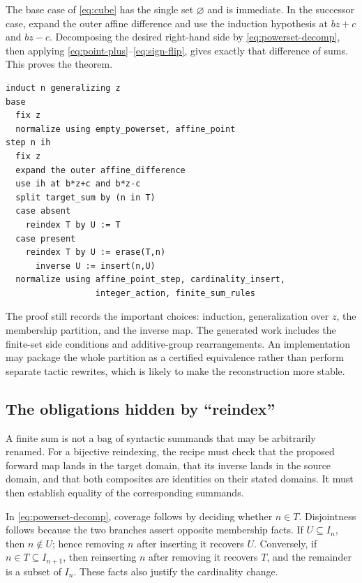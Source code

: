 \documentclass[11pt,letterpaper]{article}
\theoremstyle{remark}
\begin{document}
The base case of \eqref{eq:cube} has the single set $\varnothing$ and is immediate. In the successor case, expand the outer affine difference and use the induction hypothesis at $bz+c$ and $bz-c$. Decomposing the desired right-hand side by \eqref{eq:powerset-decomp}, then applying \eqref{eq:point-plus}--\eqref{eq:sign-flip}, gives exactly that difference of sums. This proves the theorem.

\par\noindent\begin{minipage}{\linewidth}
\begin{lstlisting}[caption={Proposed Loom proof exposing the partition and the changed arguments.}]
induct n generalizing z
base
  fix z
  normalize using empty_powerset, affine_point
step n ih
  fix z
  expand the outer affine_difference
  use ih at b*z+c and b*z-c
  split target_sum by (n in T)
  case absent
    reindex T by U := T
  case present
    reindex T by U := erase(T,n)
      inverse U := insert(n,U)
  normalize using affine_point_step, cardinality_insert,
                  integer_action, finite_sum_rules
\end{lstlisting}
\end{minipage}\par
The proof still records the important choices: induction, generalization over $z$, the membership partition, and the inverse map. The generated work includes the finite-set side conditions and additive-group rearrangements. An implementation may package the whole partition as a certified equivalence rather than perform separate tactic rewrites, which is likely to make the reconstruction more stable.

\subsection{The obligations hidden by ``reindex''}

A finite sum is not a bag of syntactic summands that may be arbitrarily renamed. For a bijective reindexing, the recipe must check that the proposed forward map lands in the target domain, that its inverse lands in the source domain, and that both composites are identities on their stated domains. It must then establish equality of the corresponding summands.

In \eqref{eq:powerset-decomp}, coverage follows by deciding whether $n\in T$. Disjointness follows because the two branches assert opposite membership facts. If $U\subseteq I_n$, then $n\notin U$; hence removing $n$ after inserting it recovers $U$. Conversely, if $n\in T\subseteq I_{n+1}$, then reinserting $n$ after removing it recovers $T$, and the remainder is a subset of $I_n$. These facts also justify the cardinality change.
\end{document}
